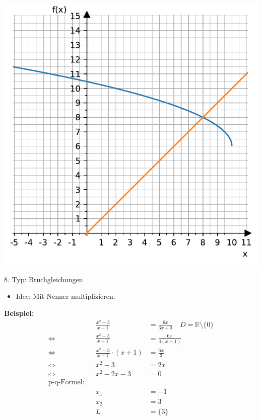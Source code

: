 \documentclass[
  ignorenonframetext,
  aspectratio=169,
]{beamer}
\providecommand{\tightlist}{%
  \setlength{\itemsep}{0pt}\setlength{\parskip}{0pt}}\usepackage{longtable,booktabs,array}
\begin{document}
\begin{frame}
\includegraphics{3_Gleichungen_files/figure-beamer/cell-8-output-1.pdf}

\begin{block}{8. Typ: Bruchgleichungen}
\label{typ-bruchgleichungen}
\begin{itemize}
\tightlist
\item
  Idee: Mit Nenner multiplizieren.
\end{itemize}

\textbf{Beispiel:} \[
\begin{aligned}
&& \frac{x^2-3}{x+1}&= \frac{6x}{3x+3}\quad D=\mathbb{R}\setminus \{0\}\\
\Leftrightarrow&& \frac{x^2-3}{x+1}&= \frac{6x}{3(x+1)}\\
\Leftrightarrow&& \frac{x^2-3}{x+1}\cdot (x+1)&= \frac{6x}{3}\\
\Leftrightarrow&& x^2-3&= 2x\\
\Leftrightarrow&& x^2-2x-3&= 0\\
\text{p-q-Formel:}\\
&&x_1 &= -1\\
&&x_2 &= 3\\
&&L &= \{3\}
\end{aligned}
\]
\end{block}
\end{frame}
\end{document}
